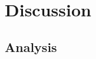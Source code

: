 \chapter{Discussion} %

\label{chap:discussion} %



\section{Analysis}

\begin{comment}

\section{Discovered issues and pitfalls}
The development of the \ac{K8s} cluster and the containerization of \ac{OT} hides several pitfalls. These are discussed in this chapter.


- Containerfile support differs from Dockerfile: Path of ENTRYPOINT is not treated the same way.
- K8s Documentation redirects to a different page when searching for tutorial for adding windows nodes
- Error messages of Windows hcs shim are not explanatory

- Windows needs to have certain Update installed to run flannel container

- Windows base image has to have same build number than host computer (not the same in linux containers)

- Scripts and docs are maintained by a relatively small community (SIG windows tools)

- Cluster networking throws weird error messages when performed inside hyper-v vm ("Directory not found")

- Docker support was removed, containerd is not fully supported yet (without bugs) in Windows

- OpenTwin needs to be compiled on the system it is running. Developers need to fix this issue.


\end{comment}